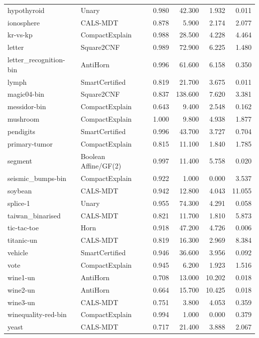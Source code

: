 \begin{longtable}{llrrrr}
hypothyroid & Unary & 0.980 & 42.300 & 1.932 & 0.011 \\
ionosphere & CALS-MDT & 0.878 & 5.900 & 2.174 & 2.077 \\
kr-vs-kp & CompactExplain & 0.988 & 28.500 & 4.228 & 4.464 \\
letter & Square2CNF & 0.989 & 72.900 & 6.225 & 1.480 \\
letter\_recognition-bin & AntiHorn & 0.996 & 61.600 & 6.158 & 0.350 \\
lymph & SmartCertified & 0.819 & 21.700 & 3.675 & 0.011 \\
magic04-bin & Square2CNF & 0.837 & 138.600 & 7.620 & 3.381 \\
messidor-bin & CompactExplain & 0.643 & 9.400 & 2.548 & 0.162 \\
mushroom & CompactExplain & 1.000 & 9.800 & 4.938 & 1.877 \\
pendigits & SmartCertified & 0.996 & 43.700 & 3.727 & 0.704 \\
primary-tumor & CompactExplain & 0.815 & 11.100 & 1.840 & 1.785 \\
segment & Boolean Affine/GF(2) & 0.997 & 11.400 & 5.758 & 0.020 \\
seismic\_bumps-bin & CompactExplain & 0.922 & 1.000 & 0.000 & 3.537 \\
soybean & CALS-MDT & 0.942 & 12.800 & 4.043 & 11.055 \\
splice-1 & Unary & 0.955 & 74.300 & 4.291 & 0.058 \\
taiwan\_binarised & CALS-MDT & 0.821 & 11.700 & 1.810 & 5.873 \\
tic-tac-toe & Horn & 0.918 & 47.200 & 4.726 & 0.006 \\
titanic-un & CALS-MDT & 0.819 & 16.300 & 2.969 & 8.384 \\
vehicle & SmartCertified & 0.946 & 36.600 & 3.956 & 0.092 \\
vote & CompactExplain & 0.945 & 6.200 & 1.923 & 1.516 \\
wine1-un & AntiHorn & 0.708 & 13.000 & 10.202 & 0.018 \\
wine2-un & AntiHorn & 0.664 & 15.700 & 10.425 & 0.018 \\
wine3-un & CALS-MDT & 0.751 & 3.800 & 4.053 & 0.359 \\
winequality-red-bin & CompactExplain & 0.994 & 1.000 & 0.000 & 0.379 \\
yeast & CALS-MDT & 0.717 & 21.400 & 3.888 & 2.067 \\
\bottomrule
\end{longtable}
\endgroup

